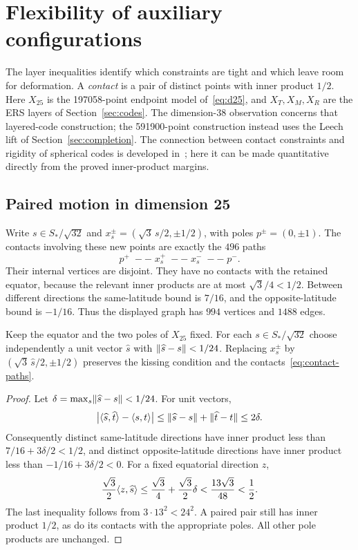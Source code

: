 \section{Flexibility of auxiliary configurations}\label{sec:deformations}

The layer inequalities identify which constraints are tight and which
leave room for deformation. A \emph{contact} is a pair of distinct
points with inner product $1/2$. Here $X_{25}$ is the 197058-point
endpoint model of~\eqref{eq:d25}, and $X_T,X_M,X_R$ are the ERS layers
of Section~\ref{sec:codes}. The dimension-38 observation concerns
that layered-code construction; the 591900-point construction instead
uses the Leech lift of Section~\ref{sec:completion}.
The connection between contact
constraints and rigidity of spherical codes is developed
in~\cite{cjkt}; here it can be made quantitative directly from the
proved inner-product margins.

\subsection{Paired motion in dimension 25}
Write $s\in S_*/\sqrt{32}$ and
$x_s^{\pm}=(\sqrt3\,s/2,\pm1/2)$, with poles $p^{\pm}=(0,\pm1)$.
The contacts involving these new points are exactly the $496$ paths
\begin{equation}\label{eq:contact-paths}
 p^+\;--\;x_s^+\;--\;x_s^-\;--\;p^-.
\end{equation}
Their internal vertices are disjoint. They have no contacts with the
retained equator, because the relevant inner products are at most
$\sqrt3/4<1/2$. Between different directions the same-latitude bound
is $7/16$, and the opposite-latitude bound is $-1/16$. Thus the
displayed graph has $994$ vertices and $1488$ edges.

\begin{proposition}\label{prop:d25-motion}
Keep the equator and the two poles of $X_{25}$ fixed. For each
$s\in S_*/\sqrt{32}$ choose independently a unit vector $\widehat s$
with $\lVert \widehat s-s\rVert<1/24$. Replacing $x_s^\pm$ by
$(\sqrt3\,\widehat s/2,\pm1/2)$ preserves the kissing condition and
the contacts~\eqref{eq:contact-paths}.
\end{proposition}
\begin{proof}
Let $\delta=\max_s\lVert \widehat s-s\rVert<1/24$. For unit vectors,
\[
 \bigl|\langle \widehat s,\widehat t\rangle-\langle s,t\rangle\bigr|
 \le\lVert \widehat s-s\rVert+\lVert \widehat t-t\rVert\le2\delta.
\]
Consequently distinct same-latitude directions have inner product
less than $7/16+3\delta/2<1/2$, and distinct opposite-latitude
directions have inner product less than $-1/16+3\delta/2<0$.
For a fixed equatorial direction $z$,
\[
 \frac{\sqrt3}{2}\langle z,\widehat s\rangle
 \le\frac{\sqrt3}{4}+\frac{\sqrt3}{2}\delta
 <\frac{13\sqrt3}{48}<\frac12.
\]
The last inequality follows from $3\cdot13^2<24^2$. A paired pair
still has inner product $1/2$, as do its contacts with the appropriate
poles. All other pole products are unchanged.
\end{proof}

